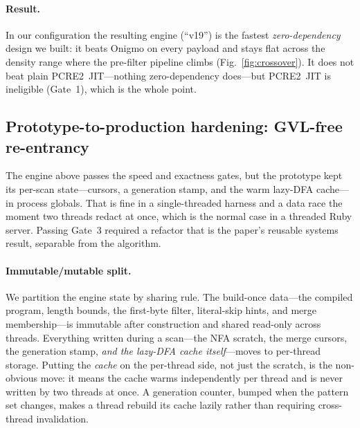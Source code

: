 \documentclass[acmsmall,nonacm,screen]{acmart}
\begin{document}
\paragraph{Result.} In our configuration the resulting engine (``v19'') is
the fastest \emph{zero-dependency} design we built: it beats Onigmo on every
payload and stays flat across the density range where the pre-filter pipeline
climbs (Fig.~\ref{fig:crossover}). It does not beat plain PCRE2~JIT---nothing
zero-dependency does---but PCRE2~JIT is ineligible (Gate~1), which is the whole
point.

\subsection{Prototype-to-production hardening: GVL-free re-entrancy}
\label{sec:finding-hardening}
The engine above passes the speed and exactness gates, but the prototype kept its
per-scan state---cursors, a generation stamp, and the warm lazy-DFA cache---in
process globals. That is fine in a single-threaded harness and a data race the
moment two threads redact at once, which is the normal case in a threaded Ruby
server. Passing Gate~3 required a refactor that is the paper's reusable systems
result, separable from the algorithm.

\paragraph{Immutable/mutable split.} We partition the engine state by sharing rule.
The build-once data---the compiled program, length bounds, the first-byte filter,
literal-skip hints, and merge membership---is immutable after construction and
shared read-only across threads. Everything written during a scan---the NFA
scratch, the merge cursors, the generation stamp, \emph{and the lazy-DFA cache
itself}---moves to per-thread storage. Putting the \emph{cache} on the per-thread
side, not just the scratch, is the non-obvious move: it means the cache warms
independently per thread and is never written by two threads at once. A generation
counter, bumped when the pattern set changes, makes a thread rebuild its cache
lazily rather than requiring cross-thread invalidation.
\end{document}
